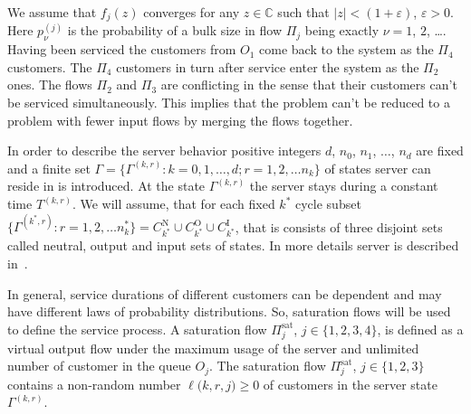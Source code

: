 \documentclass[60x84/16,10pt]{dccn}
\begin{document}
{We assume that $f_j(z)$ converges for any $z\in \mathbb{C}$ such that $|z|<(1+\varepsilon)$,
$\varepsilon>0$. Here $p_{\nu}^{(j)}$ is the probability of a bulk size in flow $\Pi_j$ being
exactly $\nu=1$, $2$, \ldots. Having been serviced the customers from $O_1$ come back to the system
as the $\Pi_4$ customers. The $\Pi_4$ customers in turn after service enter the system as the
$\Pi_2$ ones. The flows $\Pi_2$ and $\Pi_3$ are conflicting in the sense that their customers can't
be serviced simultaneously. This implies that the problem can't be reduced to a problem with fewer
input flows by merging the flows together.


In order to describe the server behavior positive integers $d$, $n_0$, $n_1$, $\ldots$,
$n_d$ are fixed and a finite set $\Gamma=\{\Gamma^{(k,r)} \colon k=0,1,\ldots,d; r=1,2,\ldots
n_k\}$ of states server can reside in is introduced. At the state $\Gamma^{(k,r)}$ the server stays during a constant 
time $T^{(k,r)}$. We will assume, that for each fixed $k^*$ cycle subset $\{\Gamma^{(k^*,r)} \colon r=1,2,\ldots
n_k^*\} = C_{k^*}^{\mathrm{N}} \cup  C_{k^*}^{\mathrm{O}} \cup  C_{k^*}^{\mathrm{I}}$, that is consists of three disjoint sets called neutral, output and input sets of states.  In more details server is described in~\cite{k:z:2016:2}.

In general, service durations of different customers can be dependent and may have different laws of
probability distributions. So, saturation flows will be used to define the service process. A
saturation flow $\Pi^{\mathrm{\text{sat}}}_j$, $j \in \{1,2,3,4\}$, is defined as a virtual output
flow under the maximum usage of the server and unlimited number of customer in the queue $O_j$. The
saturation flow $\Pi^{\mathrm{\text{sat}}}_j$, $j\in \{1,2,3\}$ contains a non-random number
$\ell({k,r,j)}\geqslant0$ of customers in the server state $\Gamma^{(k,r)}$.

}
\end{document}
